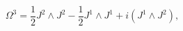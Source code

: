 \begin{equation}
\Omega^3=\frac{1}{2}J^2\wedge J^2-\frac{1}{2}J^1\wedge J^1 +i(J^1\wedge J^2),
\end{equation}

